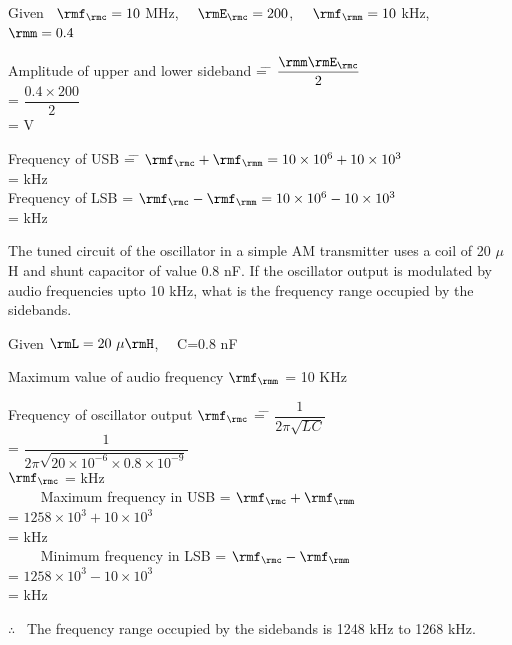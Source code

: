 \begin{solution}
Given ~$\rmf_\rmc = 10$ MHz, ~~$\rmE_\rmc = 200$, ~~$\rmf_\rmm =10$
kHz, ~~$\rmm = 0.4$

\smallskip
\begin{tabbing}
Amplitude of upper and lower sideband \= = \= $\dfrac{\rmm\rmE_\rmc}{2}$\\[0.2cm]
\> = \> $\dfrac{0.4 \times 200}{2}$\\[0.2cm]
\> =  V
\end{tabbing}
\begin{tabbing}
Frequency of USB \= = \= $\rmf_\rmc + \rmf_\rmm = 10 \times 10^6 + 10 \times 10^3$\\[0.1cm]
\> =  kHz\\[0.1cm]
Frequency of LSB \> = \> $\rmf_\rmc - \rmf_\rmm = 10 \times 10^6 -10 \times 10^3$\\[0.1cm]
\> =  kHz
\end{tabbing}
\end{solution}

\begin{problem}\label{prob8.2}
The tuned circuit of the oscillator in a simple AM transmitter uses a
coil of 20 $\mu$H and shunt capacitor of value 0.8 nF. If the
oscillator output is modulated by audio frequencies upto 10 kHz, what
is the frequency range occupied by the sidebands.
\end{problem}

\begin{solution}
Given $\rmL = 20 ~\mu\rmH$, ~~C=0.8 nF

Maximum value of audio frequency $\rmf_\rmm$ = 10 KHz
\begin{tabbing}
Frequency of oscillator output $\rmf_\rmc$ \= = \=
$\dfrac{1}{2\pi \sqrt{LC}}$\\[4pt]
\> = \> $\dfrac{1}{2\pi \sqrt{20 \times 10^{-6} \times 0.8 \times
10^{-9}}}$\\[0.15cm]
\hspace{4.6cm} $\rmf_\rmc$ \> =  kHz\\[4pt]
~~~~ Maximum frequency in USB \> = \> $\rmf_\rmc + \rmf_\rmm$\\[4pt]
\> = \> $1258 \times 10^3 + 10 \times 10^3$ \\[4pt]
\> =  kHz\\[4pt]
~~~~ Minimum frequency in LSB \> = \> $\rmf_\rmc - \rmf_\rmm$\\[4pt]
\> = \> $1258 \times 10^3 - 10 \times 10^3$\\[4pt]
\> =  kHz
\end{tabbing}
$\therefore$~ The frequency range occupied by the sidebands is 1248
kHz to 1268 kHz.
\end{solution}

